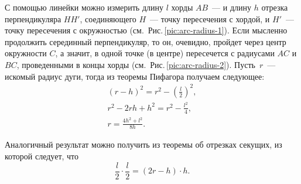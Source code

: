 С помощью линейки можно измерить длину $l$ хорды $AB$~--- и длину $h$ отрезка перпендикуляра $HH'$, соединяющего $H$~--- точку пересечения с хордой,  и $H'$~--- точку пересечения с окружностью (см.~Рис.\,\ref{pic:arc-radius-1}). Если мысленно продолжить серединный перпендикуляр, то он, очевидно, пройдет через центр окружности $C$, а значит, в одной точке (в центре) пересечется с радиусами $AC$ и $BC$, проведенными в концы хорды (см.~Рис.\,\ref{pic:arc-radius-2}). Пусть~$r$~--- искомый радиус дуги, тогда из теоремы Пифагора получаем следующее:
\begin{gather*}
    (r - h)^2 = r^2 - \left( \frac{l}{2} \right)^2,\\
    r^2 - 2rh + h^2 = r^2 - \frac{l^2}{4},\\
    r = \frac{4h^2 + l^2}{8h}.
\end{gather*}

Аналогичный результат можно получить из теоремы об отрезках секущих, из которой следует, что
\begin{equation*}
    \frac{l}{2} \cdot \frac{l}{2} = (2r - h) \cdot h.
\end{equation*}

